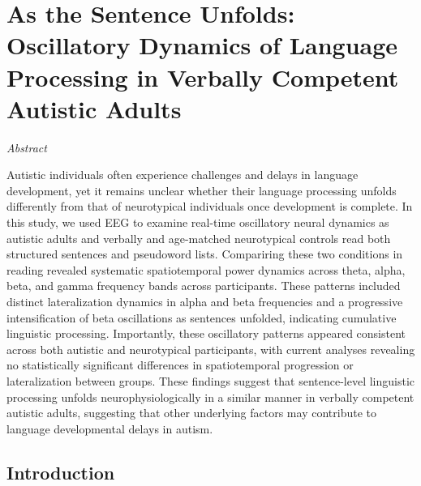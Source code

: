 \chapter{As the Sentence Unfolds: Oscillatory Dynamics of Language Processing in Verbally Competent Autistic Adults}
\label{ch:language_asc}

\vspace{-1cm}
\begin{center}
    \large\textit{Abstract}
\end{center} 

{\abstractfont 
Autistic individuals often experience challenges and delays in language development, yet it remains unclear whether their language processing unfolds differently from that of neurotypical individuals once development is complete. In this study, we used EEG to examine real-time oscillatory neural dynamics as autistic adults and verbally and age-matched neurotypical controls read both structured sentences and pseudoword lists. Compariring these two conditions in reading revealed systematic spatiotemporal power dynamics across theta, alpha, beta, and gamma frequency bands across participants. These patterns included distinct lateralization dynamics in alpha and beta frequencies and a progressive intensification of beta oscillations as sentences unfolded, indicating cumulative linguistic processing. Importantly, these oscillatory patterns appeared consistent across both autistic and neurotypical participants, with current analyses revealing no statistically significant differences in spatiotemporal progression or lateralization between groups. These findings suggest that sentence-level linguistic processing unfolds neurophysiologically in a similar manner in verbally competent autistic adults, suggesting that other underlying factors may contribute to language developmental delays in autism.  
} 

\vspace{2cm}

\thispagestyle{empty}

\newpage

\section*{Introduction}

